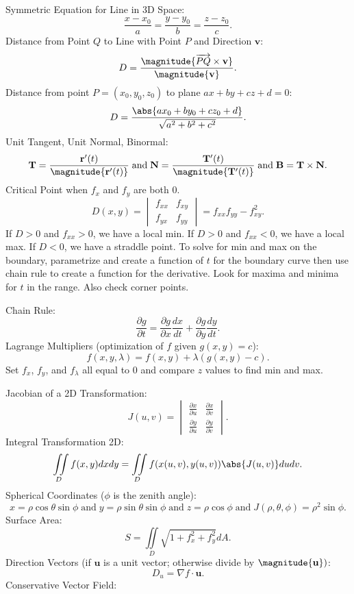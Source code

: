 \documentclass[11pt]{scrartcl}
\newcommand{\bvec}[1]{\mathbf{#1}}
\begin{document}
    Symmetric Equation for Line in 3D Space:
    \[\frac{x - x_{0}}{a} = \frac{y - y_{0}}{b} = \frac{z - z_{0}}{c}.\]
    Distance from Point $Q$ to Line with Point $P$ and Direction $\bvec{v}$:
    \[D = \frac{\magnitude{\overrightarrow{PQ} \times \bvec{v}}}{\magnitude{\bvec{v}}}.\]
    Distance from point $P = (x_{0}, y_{0}, z_{0})$ to plane $ax + by + cz + d = 0$:
    \[D = \frac{\abs{ax_{0} + by_{0} + cz_{0} + d}}{\sqrt{a^{2} + b^{2} + c^{2}}}.\]
    Unit Tangent, Unit Normal, Binormal:
    \[\bvec{T} = \frac{\bvec{r}'(t)}{\magnitude{\bvec{r}'(t)}} \; \text{and} \; \bvec{N} = \frac{\bvec{T}'(t)}{\magnitude{\bvec{T}'(t)}} \; \text{and} \; \bvec{B} = \bvec{T} \times \bvec{N}.\]
    Critical Point when $f_{x}$ and $f_{y}$ are both $0$.
    \[D(x, y) = \begin{vmatrix}
        f_{xx} & f_{xy} \\
        f_{yx} & f_{yy}
    \end{vmatrix} = f_{xx}f_{yy} - f_{xy}^{2}.\]
    If $D > 0$ and $f_{xx} > 0$, we have a local min. If $D > 0$ and $f_{xx} < 0$, we have a local max. If $D < 0$, we have a straddle point. To solve for min and max on the boundary, parametrize and create a function of $t$ for the boundary curve then use chain rule to create a function for the derivative. Look for maxima and minima for $t$ in the range. Also check corner points.
    
    Chain Rule:
    \[\frac{\partial g}{\partial t} = \frac{\partial g}{\partial x}\frac{dx}{dt} + \frac{\partial g}{\partial y}\frac{dy}{dt}.\]
    Lagrange Multipliers (optimization of $f$ given $g(x, y) = c$):
    \[f(x, y, \lambda) = f(x, y) + \lambda(g(x, y) - c).\]
    Set $f_{x}$, $f_{y}$, and $f_{\lambda}$ all equal to $0$ and compare $z$ values to find min and max.

    Jacobian of a 2D Transformation:
    \[J(u, v) = \begin{vmatrix}
        \frac{\partial x}{\partial u} & \frac{\partial x}{\partial v} \\
        \frac{\partial y}{\partial u} & \frac{\partial y}{\partial v}
    \end{vmatrix}.\]
    Integral Transformation 2D:
    \[\iint\limits_{D}f(x, y)dxdy = \iint\limits_{D}f(x(u, v), y(u, v))\abs{J(u, v)}dudv.\]
    Spherical Coordinates ($\phi$ is the zenith angle):
    \[x = \rho\cos\theta\sin\phi \; \text{and} \; y = \rho\sin\theta\sin\phi \; \text{and} \; z = \rho\cos\phi \; \text{and} \; J(\rho, \theta, \phi) = \rho^{2}\sin\phi.\]
    Surface Area:
    \[S = \iint\limits_{D}\sqrt{1 + f_{x}^{2} + f_{y}^{2}}dA.\]
    Direction Vectors (if $\bvec{u}$ is a unit vector; otherwise divide by $\magnitude{\bvec{u}})$:
    \[D_{u} = \nabla f \cdot \bvec{u}.\]
    Conservative Vector Field:
\end{document}
